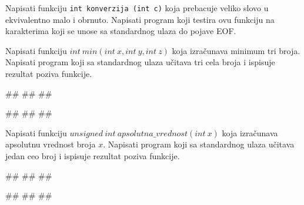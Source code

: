 \begin{Exercise}[label=v1.4_14] 
Napisati funkciju 
\verb|int konverzija (int c)|
koja prebacuje veliko slovo u ekvivalentno malo i obrnuto. Napisati program koji testira ovu funkciju na karakterima koji se unose sa standardnog ulaza do pojave EOF.\\ 
\end{Exercise}
\begin{Answer}[ref=v1.4_14]
\end{Answer}


\begin{Exercise}[label=p1.4_] 
Napisati funkciju $int\ min(int\ x, int\ y, int\ z)$ koja izračunava minimum tri broja. Napisati program koji sa standardnog ulaza učitava tri cela broja i ispisuje rezultat poziva funkcije. \\
\begin{miditest}
\begin{upotreba}{1}
#\naslovInt#
##
##
\end{upotreba}
\end{miditest}
\begin{miditest}
\begin{upotreba}{2}
#\naslovInt#
##
##
\end{upotreba}
\end{miditest}
\end{Exercise}
\begin{Answer}[ref=p1.4_]
\end{Answer}

\begin{Exercise}[label=p1.4_] 
Napisati funkciju $unsigned\ int\ apsolutna\_vrednost(int\ x)$ koja izračunava apsolutnu vrednost broja $x$. Napisati program koji sa standardnog ulaza učitava jedan ceo broj i ispisuje rezultat poziva funkcije.  \\
\begin{miditest}
\begin{upotreba}{1}
#\naslovInt#
##
##
\end{upotreba}
\end{miditest}
\begin{miditest}
\begin{upotreba}{2}
#\naslovInt#
##
##
\end{upotreba}
\end{miditest}

\end{Exercise}
\begin{Answer}[ref=p1.4_]
\end{Answer}

